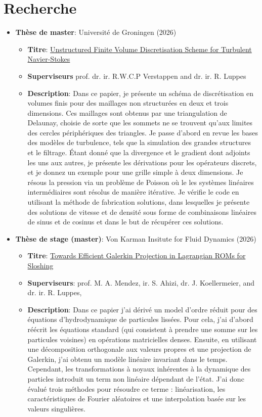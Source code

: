 \section*{Recherche}
\begin{itemize}
    \item \textbf{Thèse de master}: Université de Groningen (2026) \begin{itemize}
        \item \textbf{Titre}: \href{https://milenemdvl.github.io/CV/theses/MasterThesis.pdf}{Unstructured Finite Volume Discretisation Scheme for Turbulent Navier-Stokes}
        \item \textbf{Superviseurs} prof. dr. ir. R.W.C.P Verstappen and dr. ir. R. Luppes 
        \item \textbf{Description}: Dans ce papier, je présente un schéma de discrétisation en volumes finis pour des maillages non structurées en deux et trois dimensions. Ces maillages sont obtenus par une triangulation de Delaunay, choisie de sorte que les sommets ne se trouvent qu’aux limites des cercles périphériques des triangles. Je passe d’abord en revue les bases des modèles de turbulence, tels que la simulation des grandes structures et le filtrage. Étant donné que la divergence et le gradient dont adjoints les uns aux autres, je présente les dérivations pour les opérateurs discrets, et je donnez un exemple pour une grille simple à deux dimensions. Je résous la pression via un problème de Poisson où le les systèmes linéaires intermédiaires sont résolus de manière itérative. Je vérifie le code en utilisant la méthode de fabrication solutions, dans lesquelles je présente des solutions de vitesse et de densité sous forme de combinaisons linéaires de sinus et de cosinus et dans le but de récupérer ces solutions.
    \end{itemize}
    \item \textbf{Thèse de stage (master)}: Von Karman Insitute for Fluid Dynamics (2026) \begin{itemize}
        \item \textbf{Titre}: \href{https://milenemdvl.github.io/CV/theses/InternshipThesis.pdf}{Towards Efficient Galerkin Projection in
        Lagrangian ROMs for Sloshing}
        \item \textbf{Superviseurs}: prof. M. A. Mendez, ir. S. Ahizi,  dr. J. Koellermeier, and dr. ir. R.
        Luppes,
        \item \textbf{Description}: Dans ce papier j'ai dérivé un model d'ordre réduit pour des équations d'hydrodynamique de particules lissées. Pour cela, j'ai d'abord réécrit les équations standard (qui consistent à prendre une somme sur les particules voisines) en opérations matricielles denses. Ensuite, en utilisant une décomposition orthogonale aux valeurs propres et une projection de Galerkin, j'ai obtenu un modèle linéaire invariant dans le temps. Cependant, les transformations à noyaux inhérentes à la dynamique des particles introduit un term non linéaire dépendant de l'état. J'ai donc évalué trois méthodes pour résoudre ce terme : linéarisation, les caractéristiques de Fourier aléatoires et une interpolation basée sur les valeurs singulières. 

\end{itemize}
\end{itemize}
